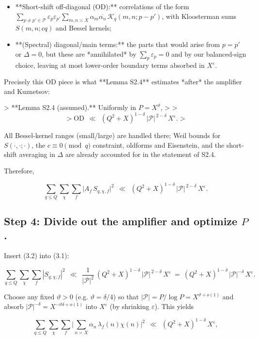 \documentclass[11pt]{article}
\theoremstyle{definition}
\theoremstyle{remark}
\begin{document}
\begin{itemize}
\item **Short-shift off-diagonal (OD):** correlations of the form
  $\sum_{p\neq p'\in\mathcal P}\varepsilon_p\varepsilon_{p'}\sum_{m,n\asymp X}\alpha_m\overline{\alpha_n}\, \mathcal{K}_{q}(m, n; p-p')$,
  with Kloosterman sums $S(m,n;cq)$ and Bessel kernels;
\item **(Spectral) diagonal/main terms:** the parts that would arise from $p=p'$ or $\Delta=0$, but these are *annihilated* by $\sum_p\varepsilon_p=0$ and by our balanced-sign choice, leaving at most lower-order boundary terms absorbed in $X^{\varepsilon}$.
\end{itemize}

Precisely this OD piece is what **Lemma S2.4** estimates *after* the amplifier and Kuznetsov:

> **Lemma S2.4 (assumed).** Uniformly in $P=X^\vartheta$,
>
> $$
> \mathrm{OD}\ \ \ll\ \ (Q^2+X)^{1-\delta}\,|\mathcal P|^{\,2-\delta}\,X^{\varepsilon}.
> $$

All Bessel-kernel ranges (small/large) are handled there; Weil bounds for $S(\cdot,\cdot;\cdot)$, the $c\equiv0\pmod q$ constraint, oldforms and Eisenstein, and the short-shift averaging in $\Delta$ are already accounted for in the statement of S2.4.

Therefore,

\begin{equation}
\sum_{q\le Q}\sum_{\chi}\sum_f \big|A_f\,S_{q,\chi,f}\big|^2
\ \ \ll\ \ (Q^2+X)^{1-\delta}\,|\mathcal P|^{\,2-\delta}\,X^{\varepsilon}.
\tag{3.2}
\end{equation}


\subsection*{Step 4: Divide out the amplifier and optimize $P$.}
Insert (3.2) into (3.1):

$$
\sum_{q\le Q}\sum_{\chi}\sum_f |S_{q,\chi,f}|^2
\ \ \ll\ \ \frac{1}{|\mathcal P|^2}\ (Q^2+X)^{1-\delta}\,|\mathcal P|^{\,2-\delta}\,X^{\varepsilon}
\ =\ (Q^2+X)^{1-\delta}\,|\mathcal P|^{-\delta}\,X^{\varepsilon}.
$$

Choose any fixed $\vartheta>0$ (e.g. $\vartheta=\delta/4$) so that $|\mathcal P|=P/\log P=X^{\vartheta+o(1)}$ and absorb $|\mathcal P|^{-\delta}=X^{-\vartheta\delta+o(1)}$ into $X^{\varepsilon}$ (by shrinking $\varepsilon$). This yields

$$
\sum_{q\le Q}\sum_{\chi}\sum_f \Big|\sum_{n\asymp X}\alpha_n\,\lambda_f(n)\chi(n)\Big|^2
\ \ \ll\ \ (Q^2+X)^{1-\delta}\,X^{\varepsilon},
$$
\end{document}
